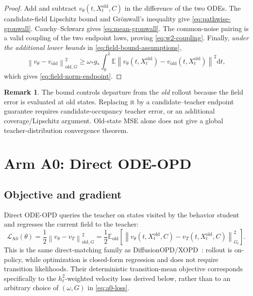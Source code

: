 \documentclass[11pt,a4paper]{article}
\newcommand{\E}{\mathbb{E}}
\newcommand{\norm}[1]{\left\lVert #1 \right\rVert}
\newcommand{\dd}{\mathrm{d}}
\newcommand{\vold}{v_{\mathrm{old}}}
\newcommand{\vT}{v_T}
\newcommand{\vtheta}{v_\theta}
\theoremstyle{plain}
\theoremstyle{definition}
\newtheorem{remark}[theorem]{Remark}
\begin{document}
\begin{proof}
Add and subtract
$\vtheta(t,X_t^{\mathrm{old}},C)$ in the difference of the two ODEs.  The candidate-field
Lipschitz bound and Gr\"onwall's inequality give \eqref{eq:pathwise-gronwall}.  Cauchy--Schwarz
gives \eqref{eq:mean-gronwall}.  The common-noise pairing is a valid coupling of the two endpoint
laws, proving \eqref{eq:w2-coupling}.  Finally,
\emph{under the additional lower bounds} in \eqref{eq:field-bound-assumptions},
\[
\norm{\vtheta-\vold}_{\mathrm{old},G}^2
\ge
\omega_*g_*
\int_0^1
\E\norm{\vtheta(t,X_t^{\mathrm{old}})-\vold(t,X_t^{\mathrm{old}})}^2\dd t,
\]
which gives \eqref{eq:field-norm-endpoint}.
\end{proof}

\begin{remark}
The bound controls departure from the \emph{old} rollout because the field error is evaluated at
old states.  Replacing it by a candidate--teacher endpoint guarantee requires candidate-occupancy
teacher error, or an additional coverage/Lipschitz argument.  Old-state MSE alone does not give a
global teacher-distribution convergence theorem.
\end{remark}

\section{Arm A0: Direct ODE-OPD}
\label{sec:a0}

\subsection{Objective and gradient}

Direct ODE-OPD queries the teacher on states visited by the behavior student and regresses the
current field to the teacher:
\begin{equation}
\mathcal L_{\mathrm{A0}}(\theta)
  =
  \frac12
  \norm{\vtheta-\vT}_{\mathrm{old},G}^2
  =
  \frac12
  \E_{\mathrm{old}}\!\left[
    \norm{\vtheta(t,X_t^{\mathrm{old}},C)
          -\vT(t,X_t^{\mathrm{old}},C)}_{G_t}^2
  \right].
\label{eq:a0-loss}
\end{equation}
This is the same direct-matching family as DiffusionOPD/XOPD~\cite{diffusionopd}: rollout is
on-policy, while optimization is closed-form regression and does not require transition
likelihoods.  Their deterministic transition-mean objective corresponds specifically to the
$h_\ell^2$-weighted velocity loss derived below, rather than to an arbitrary choice of
$(\omega,G)$ in \eqref{eq:a0-loss}.
\end{document}
